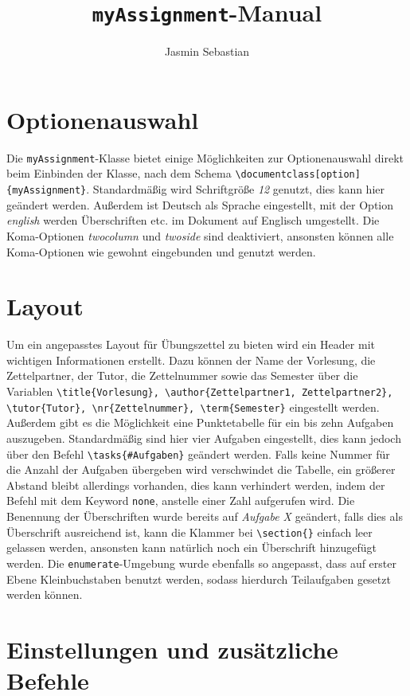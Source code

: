 \documentclass{myReport}
\title{\texttt{myAssignment}-Manual}
\author{Jasmin Sebastian}
\begin{document}

\section{Optionenauswahl}

Die \texttt{myAssignment}-Klasse bietet einige Möglichkeiten zur Optionenauswahl direkt beim Einbinden der Klasse, nach dem Schema \lstinline|\documentclass[option]{myAssignment}|. Standardmäßig wird Schriftgröße \emph{12} genutzt, dies kann hier geändert werden. Außerdem ist Deutsch als Sprache eingestellt, mit der Option \emph{english} werden Überschriften etc. im Dokument auf Englisch umgestellt. Die Koma-Optionen \emph{twocolumn} und \emph{twoside} sind deaktiviert, ansonsten können alle Koma-Optionen wie gewohnt eingebunden und genutzt werden.


\section{Layout}

Um ein angepasstes Layout für Übungszettel zu bieten wird ein Header mit wichtigen Informationen erstellt. Dazu können der Name der Vorlesung, die Zettelpartner, der Tutor, die Zettelnummer sowie das Semester über die Variablen \lstinline|\title{Vorlesung}, \author{Zettelpartner1, Zettelpartner2}, \tutor{Tutor}, \nr{Zettelnummer}, \term{Semester}| eingestellt werden. Außerdem gibt es die Möglichkeit eine Punktetabelle für ein bis zehn Aufgaben auszugeben. Standardmäßig sind hier vier Aufgaben eingestellt, dies kann jedoch über den Befehl \lstinline|\tasks{#Aufgaben}| geändert werden. Falls keine Nummer für die Anzahl der Aufgaben übergeben wird verschwindet die Tabelle, ein größerer Abstand bleibt allerdings vorhanden, dies kann verhindert werden, indem der Befehl mit dem Keyword \lstinline|none|, anstelle einer Zahl aufgerufen wird. Die Benennung der Überschriften wurde bereits auf \emph{Aufgabe X} geändert, falls dies als Überschrift ausreichend ist, kann die Klammer bei \lstinline|\section{}| einfach leer gelassen werden, ansonsten kann natürlich noch ein Überschrift hinzugefügt werden. Die \texttt{enumerate}-Umgebung wurde ebenfalls so angepasst, dass auf erster Ebene Kleinbuchstaben benutzt werden, sodass hierdurch Teilaufgaben gesetzt werden können.


\section{Einstellungen und zusätzliche Befehle}
\end{document}
